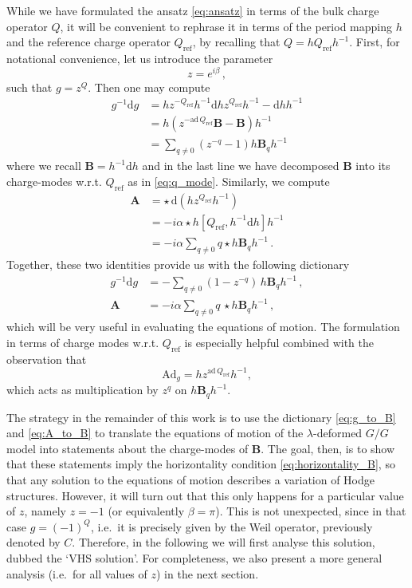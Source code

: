 \documentclass[11pt,a4paper]{article}
\numberwithin{equation}{section}
\numberwithin{table}{section}\setlength{\multlinegap}{25pt}
\newcommand{\dd}{\mathrm{d}}
\begin{document}
While we have formulated the ansatz \eqref{eq:ansatz} in terms of the bulk charge operator $Q$, it will be convenient to rephrase it in terms of the period mapping $h$ and the reference charge operator $Q_{\mathrm{ref}}$, by recalling that $Q=h Q_{\mathrm{ref}}h^{-1}$. First, for notational convenience, let us introduce the parameter
\begin{equation}
	z = e^{i\beta}\,,
\end{equation}
such that $g=z^{Q}$. Then one may compute
\begin{align}
	g^{-1}\dd g &= h z^{-Q_{\mathrm{ref}}}h^{-1} \dd h z^{Q_{\mathrm{ref}}}h^{-1}-\dd h h^{-1}\\
	&= h\left( z^{-\mathrm{ad}\,Q_{\mathrm{ref}}} \mathbf{B} - \mathbf{B}\right)h^{-1}\\
	&= \sum_{q\neq 0}(z^{-q}-1) h\mathbf{B}_q h^{-1}
\end{align}
where we recall $\mathbf{B}=h^{-1}\dd h$ and in the last line we have decomposed $\mathbf{B}$ into its charge-modes w.r.t. $Q_{\mathrm{ref}}$ as in \eqref{eq:q_mode}. Similarly, we compute
\begin{align}
	\mathbf{A} &= \star\,\dd (h z^{Q_{\mathrm{ref}}} h^{-1})\\
	&= -i\alpha\star h[Q_{\mathrm{ref}},h^{-1}\dd h]h^{-1}\\
	&=-i\alpha\sum_{q\neq 0} q \star h\mathbf{B}_q h^{-1}\,.
\end{align}
Together, these two identities provide us with the following dictionary
\begin{align}
\label{eq:g_to_B}	g^{-1}\dd g &= -\sum_{q\neq 0}(1-z^{-q})\, h\mathbf{B}_q h^{-1}\,,\\
\label{eq:A_to_B}	\mathbf{A} &= -i\alpha \sum_{q\neq 0} q\, \star h\mathbf{B}_{q}h^{-1}\,,
\end{align}
which will be very useful in evaluating the equations of motion. The formulation in terms of charge modes w.r.t. $Q_{\mathrm{ref}}$ is especially helpful combined with the observation that
\begin{equation}
\mathrm{Ad}_{g} = h z^{\mathrm{ad}\,Q_{\mathrm{ref}}}h^{-1},
\end{equation}
which acts as multiplication by $z^{q}$ on $h \mathbf{B}_q h^{-1}$.

The strategy in the remainder of this work is to use the dictionary \eqref{eq:g_to_B} and \eqref{eq:A_to_B} to translate the equations of motion of the $\lambda$-deformed $G/G$ model into statements about the charge-modes of $\mathbf{B}$. The goal, then, is to show that these statements imply the horizontality condition \eqref{eq:horizontality_B}, so that any solution to the equations of motion describes a variation of Hodge structures. However, it will turn out that this only happens for a particular value of $z$, namely $z=-1$ (or equivalently $\beta=\pi$). This is not unexpected, since in that case $g=(-1)^Q$, i.e.~it is precisely given by the Weil operator, previously denoted by $C$. Therefore, in the following we will first analyse this solution, dubbed the `VHS solution'. For completeness, we also present a more general analysis (i.e.~for all values of $z$) in the next section. 
\end{document}
